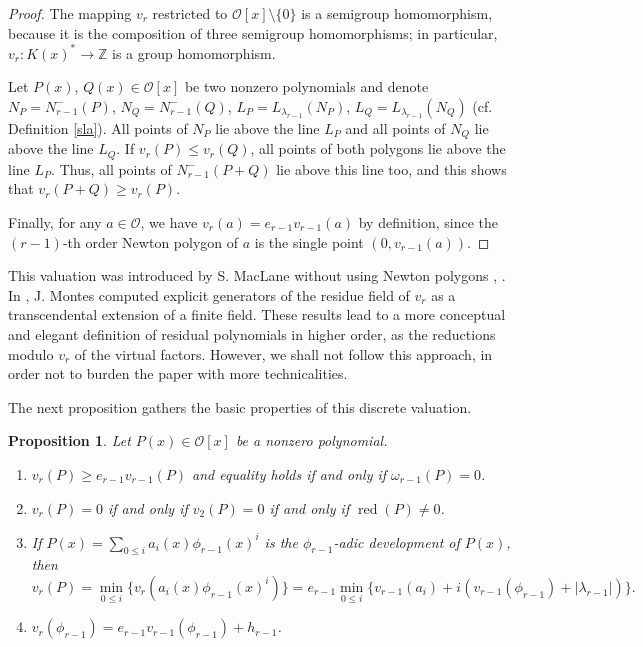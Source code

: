 \documentclass{amsart}
\newtheorem{proposition}[theorem]{Proposition}
\newcommand{\Z}{\mathbb Z}
\def\op{\operatorname}
\def\la{\lambda}
\def\lra{\longrightarrow}
\def\np#1{N_{#1}^-}
\def\om{\omega}
\def\oo{{\mathcal O}}
\def\rd{\op{red}}
\def\zpx{\oo[x]}
\begin{document}
\begin{proof}
The mapping $v_r$ restricted to $\zpx\setminus\{0\}$ is a semigroup homomorphism, because it is the composition of three semigroup homomorphisms; in particular, $v_r\colon K(x)^*\lra \Z$ is a group homomorphism.

Let $P(x),\,Q(x)\in\zpx$ be two nonzero polynomials and denote $N_P=\np{r-1}(P)$, $N_Q=\np{r-1}(Q)$, $L_P=L_{\la_{r-1}}(N_P)$, $L_Q=L_{\la_{r-1}}(N_Q)$ (cf. Definition \ref{sla}). All points of $N_P$ lie above the line $L_P$ and all points of $N_Q$ lie above the line $L_Q$. If $v_r(P)\le v_r(Q)$, all points of both polygons lie above the line $L_P$. Thus, all points of $\np{r-1}(P+Q)$ lie above this line too, and this shows that $v_r(P+Q)\ge v_r(P)$.

Finally, for any $a\in\oo$, we have $v_r(a)=e_{r-1}v_{r-1}(a)$ by definition, since the $(r-1)$-th order Newton polygon of $a$ is the single point $(0,v_{r-1}(a))$.  
\end{proof}

This valuation was introduced by S. MacLane without using Newton polygons \cite{mcla}, \cite{mclb}. In \cite[Ch.2,\S2]{m}, J. Montes computed explicit generators of the residue field of $v_r$ as a transcendental extension of a finite field. These results lead to a more conceptual and elegant definition of residual polynomials in higher order, as the reductions modulo $v_r$ of the virtual factors. However, we shall not follow this approach, in order not to burden the paper with more technicalities.
     
The next proposition gathers the basic properties of this discrete valuation.

\begin{proposition}\label{propertiesv} Let $P(x)\in\zpx$ be a nonzero polynomial.
\begin{enumerate}
 \item $v_r(P)\ge e_{r-1}v_{r-1}(P)$ and equality holds if and only if $\om_{r-1}(P)=0$.
\item $v_r(P)=0$ if and only if $v_2(P)=0$ if and only if $\rd(P)\ne0$.
\item If $P(x)=\sum_{0\le i}a_i(x)\phi_{r-1}(x)^i$ is the $\phi_{r-1}$-adic development of $P(x)$, then
$$
v_r(P)=\min_{0\le i}\{v_r(a_i(x)\phi_{r-1}(x)^i)\}=e_{r-1}\min_{0\le i}\{v_{r-1}(a_i)+i(v_{r-1}(\phi_{r-1})+|\la_{r-1}|)\}.
$$ 
\item $v_r(\phi_{r-1})=e_{r-1}v_{r-1}(\phi_{r-1})+h_{r-1}$.
\end{enumerate}
\end{proposition}
  
\end{document}

